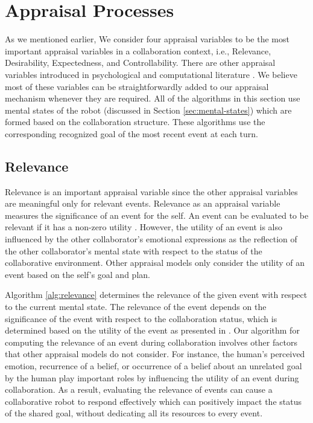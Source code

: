 \documentclass[12pt]{report}
\begin{document}
\section{Appraisal Processes}
\label{sec:appraisal}
As we mentioned earlier, We consider four appraisal variables to be the most
important appraisal variables in a collaboration context, i.e., Relevance,
Desirability, Expectedness, and Controllability. There are other appraisal
variables introduced in psychological \cite{scherer:appraisal-processes} and
computational literature \cite{gratch:domain-independent}. We believe most of
these variables can be straightforwardly added to our appraisal mechanism
whenever they are required. All of the algorithms in this section use mental
states of the robot (discussed in Section \ref{sec:mental-states}) which are
formed based on the collaboration structure. These algorithms use the
corresponding recognized goal of the most recent event at each turn.

\subsection{Relevance}
Relevance is an important appraisal variable since the other appraisal variables
are meaningful only for relevant events. Relevance as an appraisal variable
measures the significance of an event for the self. An event can be evaluated to
be relevant if it has a non-zero utility \cite{marsella:ema-process-model}.
However, the utility of an event is also influenced by the other collaborator's
emotional expressions as the reflection of the other collaborator's mental state
with respect to the status of the collaborative environment. Other appraisal
models only consider the utility of an event based on the self's goal and plan.

Algorithm \ref{alg:relevance} determines the relevance of the given event with
respect to the current mental state. The relevance of the event depends on the
significance of the event with respect to the collaboration status, which is
determined based on the utility of the event as presented in
\cite{gratch:domain-independent,marsella:ema-process-model}. Our algorithm for
computing the relevance of an event during collaboration involves other factors
that other appraisal models do not consider. For instance, the human's
perceived emotion, recurrence of a belief, or occurrence of a belief about an
unrelated goal by the human play important roles by influencing the utility
of an event during collaboration. As a result, evaluating the relevance of
events can cause a collaborative robot to respond effectively which can
positively impact the status of the shared goal, without dedicating all its
resources to every event.
\end{document}
